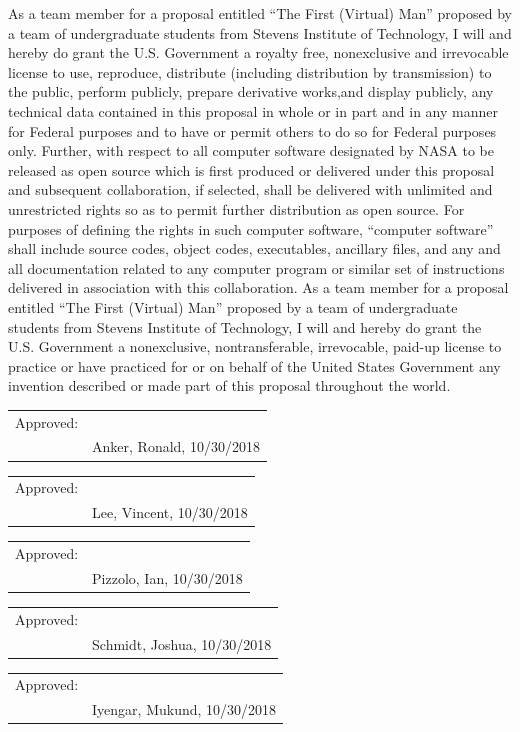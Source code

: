\documentclass{article}
\begin{document}
As a team member for a proposal entitled “The First (Virtual) Man” proposed by a team of undergraduate students from Stevens Institute of Technology, I will and hereby do grant the U.S. Government a royalty free, nonexclusive and irrevocable license to use, reproduce, distribute (including distribution by transmission) to the public, perform publicly, prepare derivative works,and display publicly, any technical data contained in this proposal in whole or in part and in any manner for Federal purposes and to have or permit others to do so for
Federal purposes only. Further, with respect to all computer software designated by
NASA to be released as open source which is first produced or delivered under this
proposal and subsequent collaboration, if selected, shall be delivered with unlimited and
unrestricted rights so as to permit further distribution as open source. For purposes of
defining the rights in such computer software, “computer software” shall include source
codes, object codes, executables, ancillary files, and any and all documentation related
to any computer program or similar set of instructions delivered in association with this
collaboration. As a team member for a proposal entitled “The First (Virtual) Man” proposed by a team of undergraduate students from Stevens Institute of Technology, I will and hereby do
grant the U.S. Government a nonexclusive, nontransferable, irrevocable, paid-up
license to practice or have practiced for or on behalf of the United States Government
any invention described or made part of this proposal throughout the world.

\bigskip
\bigskip
\bigskip

\begin{tabular}{@{}p{.5in}p{3.5in}@{}}
Approved: & \hrulefill \\
& Anker, Ronald, 10/30/2018\\
\end{tabular}

\bigskip
\bigskip
\bigskip

\begin{tabular}{@{}p{.5in}p{3.5in}@{}}
Approved: & \hrulefill \\
& Lee, Vincent, 10/30/2018\\
\end{tabular}

\bigskip
\bigskip
\bigskip

\begin{tabular}{@{}p{.5in}p{3.5in}@{}}
Approved: & \hrulefill \\
& Pizzolo, Ian, 10/30/2018\\
\end{tabular}

\bigskip
\bigskip
\bigskip

\begin{tabular}{@{}p{.5in}p{3.5in}@{}}
Approved: & \hrulefill \\
& Schmidt, Joshua, 10/30/2018\\
\end{tabular}

\bigskip
\bigskip
\bigskip

\begin{tabular}{@{}p{.5in}p{3.5in}@{}}
Approved: & \hrulefill \\
& Iyengar, Mukund, 10/30/2018\\
\end{tabular}
\end{document}
